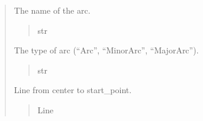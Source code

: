 \documentclass[letterpaper,10pt,english]{sphinxmanual}
\begin{document}
\begin{quote}
\begin{fulllineitems}
\begin{fulllineitems}
\begin{quote}
\begin{description}
\end{description}\end{quote}

\end{fulllineitems}


\begin{fulllineitems}
\label{\detokenize{pygeox:pygeox.basic_objects.BaseArc.name}}
\pysigstartsignatures
\pysigline
{}
\pysigstopsignatures
\sphinxAtStartPar
The name of the arc.
\begin{quote}\begin{description}
\sphinxAtStartPar
str

\end{description}\end{quote}

\end{fulllineitems}


\begin{fulllineitems}
\label{\detokenize{pygeox:pygeox.basic_objects.BaseArc.arc_type}}
\pysigstartsignatures
\pysigline
{}
\pysigstopsignatures
\sphinxAtStartPar
The type of arc (“Arc”, “MinorArc”, “MajorArc”).
\begin{quote}\begin{description}
\sphinxAtStartPar
str

\end{description}\end{quote}

\end{fulllineitems}


\begin{fulllineitems}
\label{\detokenize{pygeox:pygeox.basic_objects.BaseArc.start_radius_line}}
\pysigstartsignatures
\pysigline
{}
\pysigstopsignatures
\sphinxAtStartPar
Line from center to start\_point.
\begin{quote}\begin{description}
\sphinxAtStartPar
Line


\end{description}
\end{quote}
\end{fulllineitems}
\end{fulllineitems}
\end{quote}
\end{document}
